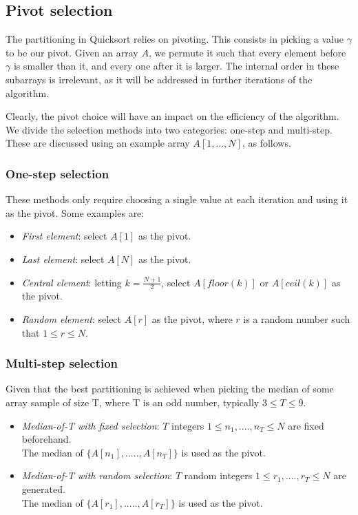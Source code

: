 \documentclass[]{finalproject}
\begin{document}
\subsection{Pivot selection}
The partitioning in Quicksort relies on pivoting. This consists in picking a value $\gamma$ to be our pivot. Given an array $A$, we permute it such that every element before $\gamma$ is smaller than it, and every one after it is larger. The internal order in these subarrays is irrelevant, as it will be addressed in further iterations of the algorithm.

Clearly, the pivot choice will have an impact on the efficiency of the algorithm. We divide the selection methods into two categories: one-step and multi-step. These are discussed using an example array $A[1, ..., N]$, as follows.

\subsubsection{One-step selection}
These methods only require choosing a single value at each iteration and using it as the pivot. Some examples are:

\begin{itemize}
\item \textit{First element}: select $A[1]$ as the pivot.
\item \textit{Last element}: select $A[N]$ as the pivot.
\item \textit{Central element}: letting $k=\frac{N+1}{2}$, select $A[floor(k)]$ or $A[ceil(k)]$ as the pivot.
\item \textit{Random element}: select $A[r]$ as the pivot, where $r$ is a random number such that $1 \leq r \leq N$.
\end{itemize}

\subsubsection{Multi-step selection}
Given that the best partitioning is achieved when picking the median of some array sample of size T, where T is an odd number, typically $3 \leq T \leq 9$.

\begin{itemize}
\item \textit{Median-of-T with fixed selection}: $T$ integers $1 \leq n_{1},....,n_{T} \leq N$ are fixed beforehand. \\
The median of $\{A[n_{1}],.....,A[n_{T}]\}$ is used as the pivot.
\item \textit{Median-of-T with random selection}: $T$ random integers $1 \leq r_{1},....,r_{T} \leq N$ are generated. \\
The median of $\{A[r_{1}],.....,A[r_{T}]\}$ is used as the pivot.
\end{itemize}
\end{document}
